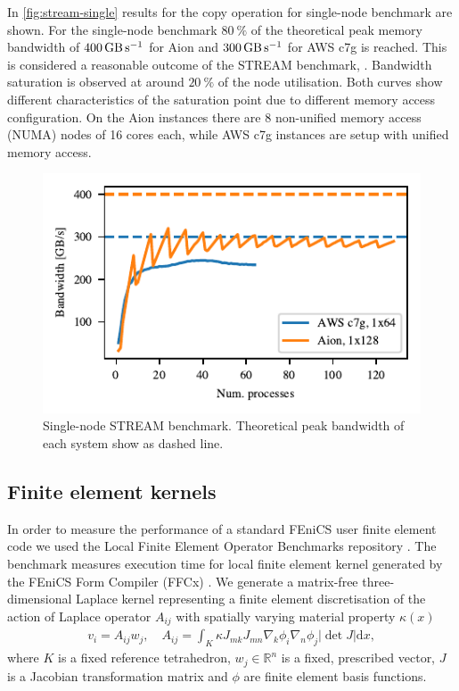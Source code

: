 In \autoref{fig:stream-single} results for the copy operation for single-node
benchmark are shown. For the single-node benchmark $\SI{80}{\percent}$ of the
theoretical peak memory bandwidth of $\SI{400}{\giga\byte\per\second}$ for Aion
and $\SI{300}{\giga\byte\per\second}$ for AWS c7g is reached. This is considered
a reasonable outcome of the STREAM benchmark, \citep{McCalpin2023}. Bandwidth
saturation is observed at around $\SI{20}{\percent}$ of the node utilisation.
Both curves show different characteristics of the saturation point due to
different memory access configuration. On the Aion instances there are 8
non-unified memory access (NUMA) nodes of 16 cores each, while AWS c7g instances
are setup with unified memory access.

\begin{figure}
\begin{center}
        \includegraphics{chapters/chp1/graphics/stream_plots/stream_single_node.pdf}
\end{center}
	\caption{Single-node STREAM benchmark. Theoretical peak bandwidth of each system show as dashed line.}
        \label{fig:stream-single}
\end{figure}

\subsection*{Finite element kernels}

In order to measure the performance of a standard FEniCS user finite element
code we used the Local Finite Element Operator Benchmarks repository
\citep{Baratta2023}. The benchmark measures execution time for local finite
element kernel generated by the FEniCS Form Compiler (FFCx)
\citep{kirby_compiler_2006}. We generate a matrix-free three-dimensional
Laplace kernel representing a finite element discretisation of the action of
Laplace operator $A_{ij}$ with spatially varying material property $\kappa(x)$
\begin{align}
    v_i = A_{ij} w_j, \quad
    A_{ij} = \int_K \kappa J_{mk} J_{mn} \nabla_k \phi_i \nabla_n \phi_j |\det J| \mathrm dx,
\end{align}
where $K$ is a fixed reference tetrahedron, $w_j \in \mathbb{R}^{n}$ is a
fixed, prescribed vector, $J$ is a Jacobian transformation matrix and $\phi$
are finite element basis functions.

